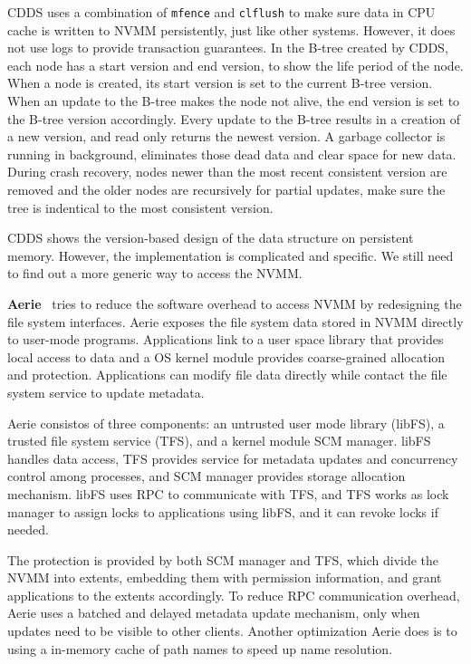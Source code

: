 CDDS uses a combination of \texttt{mfence} and \texttt{clflush} to make sure
data in CPU cache is written to NVMM persistently, just like other systems.
However, it does not use logs to provide transaction guarantees. In the B-tree
created by CDDS, each node has a start version and end version, to show the
life period of the node. When a node is created, its start version is set
to the current B-tree version. When an update to the B-tree makes the node
not alive, the end version is set to the B-tree version accordingly.
Every update to the B-tree results in a creation of
a new version, and read only returns the newest version. A garbage collector
is running in background, eliminates those dead data and clear space for
new data. During crash recovery, nodes newer than the most recent consistent
version are removed and the older nodes are recursively for partial updates,
make sure the tree is indentical to the most consistent version.

CDDS shows the version-based design of the data structure on persistent
memory. However, the implementation is complicated and specific. We still
need to find out a more generic way to access the NVMM.

\textbf{Aerie}~\cite{Aerie} tries to reduce the software overhead to access NVMM
by redesigning the file system interfaces. Aerie exposes the file system
data stored in NVMM directly to user-mode programs. Applications link to
a user space library that provides local access to data and a OS kernel
module provides coarse-grained allocation and protection. Applications can
modify file data directly while contact the file system service to update
metadata.

Aerie consistos of three components: an untrusted user mode library (libFS),
a trusted file system service (TFS), and a kernel module SCM manager. libFS
handles data access, TFS provides service for metadata updates and concurrency
control among processes, and SCM manager provides storage allocation mechanism.
libFS uses RPC to communicate with TFS, and TFS works as lock manager to 
assign locks to applications using libFS, and it can revoke locks if needed.

The protection is provided by both SCM manager and TFS, which divide the NVMM
into extents, embedding them with permission information, and grant applications
to the extents accordingly. To reduce RPC communication overhead, Aerie
uses a batched and delayed metadata update mechanism, only when updates need to
be visible to other clients. Another optimization Aerie does is to using
a in-memory cache of path names to speed up name resolution.

